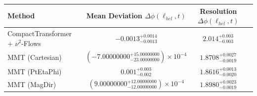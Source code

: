     \begin{tabular}{lccc}
        \toprule
        Method & Mean Deviation $\Delta\phi(\ell_{hel}, t)$ & Resolution $\Delta\phi(\ell_{hel}, t)$ \\
        \midrule
        CompactTransformer + $\nu^2$-Flows & $-0.0013^{+0.0014}_{-0.0013}$ & $2.014^{+0.003}_{-0.003}$ \\
        MMT (Cartesian) & $(-7.00000000^{+15.00000000}_{-23.00000000})\times 10^{-4}$ & $1.8708^{+0.0027}_{-0.0019}$ \\
        MMT (PtEtaPhi) & $0.001^{+0.003}_{-0.002}$ & $1.8616^{+0.0013}_{-0.0020}$ \\
        MMT (MagDir) & $(9.00000000^{+12.00000000}_{-12.00000000})\times 10^{-4}$ & $1.8980^{+0.0023}_{-0.0019}$ \\
        \bottomrule
    \end{tabular}